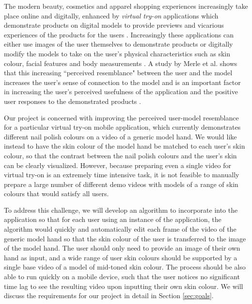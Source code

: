 The modern beauty, cosmetics and apparel shopping experiences increasingly take place online and digitally, enhanced by \textit{virtual try-on} applications which demonstrate products on digital models to provide previews and vicarious experiences of the products for the users \cite{zhang_2017_try}. Increasingly these applications can either use images of the user themselves to demonstrate products or digitally modify the models to take on the user's physical characteristics such as skin colour, facial features and body measurements \cite{shilkrot_2013_garment, li_2015_replace}. A study by Merle et al. shows that this increasing ``perceived resemblance" between the user and the model increases the user's sense of connection to the model and is an important factor in increasing the user's perceived usefulness of the application and the positive user responses to the demonstrated products \cite{merle_2012_tryon}.


Our project is concerned with improving the perceived user-model resemblance for a particular virtual try-on mobile application, which currently demonstrates different nail polish colours on a video of a generic model hand. We would like instead to have the skin colour of the model hand be matched to each user's skin colour, so that the contrast between the nail polish colours and the user's skin can be clearly visualized. However, because preparing even a single video for virtual try-on is an extremely time intensive task, it is not feasible to manually prepare a large number of different demo videos with models of a range of skin colours that would satisfy all users.

To address this challenge, we will develop an algorithm to incorporate into the application so that for each user using an instance of the application, the algorithm would quickly and automatically edit each frame of the video of the generic model hand so that the skin colour of the user is transferred to the image of the model hand. The user should only need to provide an image of their own hand as input, and a wide range of user skin colours should be supported by a single base video of a model of mid-toned skin colour. The process should be also able to run quickly on a mobile device, such that the user notices no significant time lag to see the resulting video upon inputting their own skin colour. We will discuss the requirements for our project in detail in Section \ref{sec:goals}.

